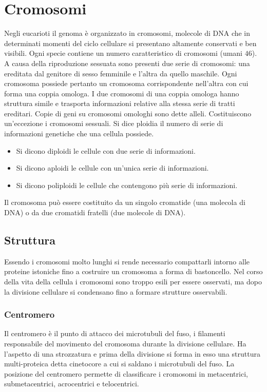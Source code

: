 \section{Cromosomi}
Negli eucarioti il genoma \`e organizzato in cromosomi, molecole di DNA che in determinati momenti del ciclo cellulare si presentano altamente conservati e ben visibili. Ogni specie contiene un numero
caratteristico di cromosomi (umani $46$). A causa della riproduzione sessuata sono presenti due serie di cromosomi: una ereditata dal genitore di sesso femminile e l'altra da quello maschile. Ogni 
cromosoma possiede pertanto un cromosoma corrispondente nell'altra con cui forma una coppia omologa. I due cromosomi di una coppia omologa hanno struttura simile e trasporta informazioni relative alla
stessa serie di tratti ereditari. Copie di geni su cromosomi omologhi sono dette alleli. Costituiscono un'eccezione i cromosomi sessuali. Si dice ploidia il numero di serie di informazioni genetiche
che una cellula possiede.
\begin{itemize}
	\item Si dicono diploidi le cellule con due serie di informazioni.
	\item Si dicono aploidi le cellule con un'unica serie di informazioni.
	\item Si dicono poliploidi le cellule che contengono pi\`u serie di informazioni.
\end{itemize}
Il cromosoma pu\`o essere costituito da un singolo cromatide (una molecola di DNA) o da due cromatidi fratelli (due molecole di DNA).
\subsection{Struttura}
Essendo i cromosomi molto lunghi si rende necessario compattarli intorno alle proteine istoniche fino a costruire un cromosoma a forma di bastoncello. Nel corso della vita della cellula i cromosomi sono 
troppo esili per essere osservati, ma dopo la divisione cellulare si condensano fino a formare strutture osservabili. 
\subsubsection{Centromero}
Il centromero \`e il punto di attacco dei microtubuli del fuso, i filamenti responsabile del movimento del cromosoma durante la divisione cellulare. Ha l'aspetto di una strozzatura e prima 
della divisione si forma in esso una struttura multi-proteica detta cinetocore a cui si saldano i microtubuli del fuso. La posizione del centromero permette di classificare i cromosomi in metacentrici, 
submetacentrici, acrocentrici e telocentrici. 
